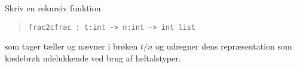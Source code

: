 Skriv en rekursiv funktion
  \begin{quote}
    \lstinline{frac2cfrac : t:int -> n:int -> int list}
  \end{quote}
  som tager tæller og nævner i brøken $t/n$ og udregner dens repræsentation som kædebrøk udelukkende ved brug af heltalstyper.
